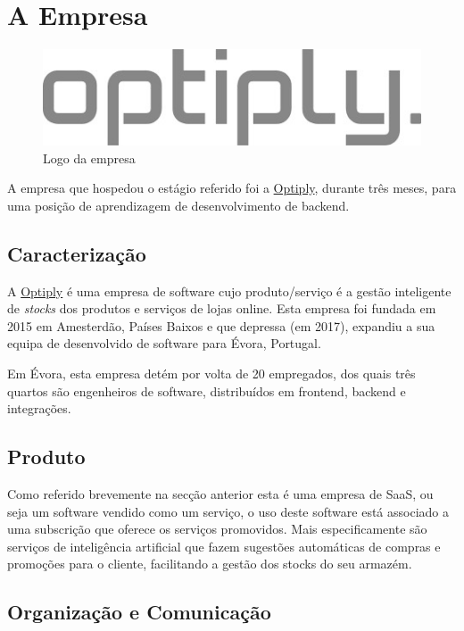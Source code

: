 \chapter{A Empresa}\label{cap2}

\begin{figure}[!hbt]
  \centering
  \includegraphics[width=12cm]{figuras/optiply_logo.jpg}
  \caption{Logo da empresa}
  \label{fig:logo}
\end{figure}
\FloatBarrier

A empresa que hospedou o estágio referido foi a \href{https://optiply.nl/}{Optiply}, durante três meses, para uma posição de aprendizagem de desenvolvimento de backend.

\section{Caracterização}

A \href{https://optiply.nl/}{Optiply} é uma empresa de software cujo produto/serviço é a gestão inteligente de \textit{stocks} dos produtos e serviços de lojas online.\cite{optiply} Esta empresa foi fundada em 2015 em Amesterdão, Países Baixos e que depressa (em 2017), expandiu a sua equipa de desenvolvido de software para Évora, Portugal.

Em Évora, esta empresa detém por volta de 20 empregados, dos quais três quartos são engenheiros de software, distribuídos em frontend, backend e integrações.

\section{Produto}

Como referido brevemente na secção anterior esta é uma empresa de SaaS, ou seja um software vendido como um serviço, o uso deste software está associado a uma subscrição que oferece os serviços promovidos. Mais especificamente são serviços de inteligência artificial que fazem sugestões automáticas de compras e promoções para o cliente, facilitando a gestão dos stocks do seu armazém.

\newpage

\section{Organização e Comunicação}

